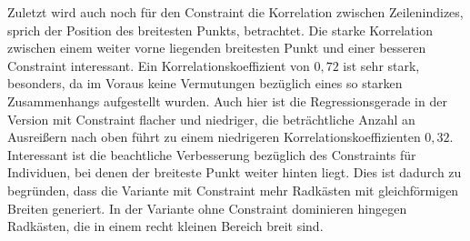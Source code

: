 Zuletzt wird auch noch für den Constraint die Korrelation zwischen Zeilenindizes, sprich der Position des breitesten Punkts, betrachtet.
Die starke Korrelation zwischen einem weiter vorne liegenden breitesten Punkt und einer besseren Constraint interessant.
Ein Korrelationskoeffizient von $0,72$ ist sehr stark, besonders, da im Voraus keine Vermutungen bezüglich eines so starken Zusammenhangs aufgestellt wurden.
Auch hier ist die Regressionsgerade in der Version mit Constraint flacher und niedriger, die beträchtliche Anzahl an Ausreißern nach oben führt zu einem niedrigeren Korrelationskoeffizienten $0,32$.
Interessant ist die beachtliche Verbesserung bezüglich des Constraints für Individuen, bei denen der breiteste Punkt weiter hinten liegt.
Dies ist dadurch zu begründen, dass die Variante mit Constraint mehr Radkästen mit gleichförmigen Breiten generiert.
In der Variante ohne Constraint dominieren hingegen  Radkästen, die in einem recht kleinen Bereich breit sind.

